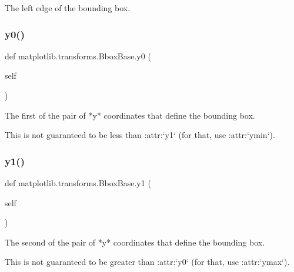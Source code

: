 \begin{DoxyVerb}The left edge of the bounding box.\end{DoxyVerb}
 \mbox{\label{classmatplotlib_1_1transforms_1_1BboxBase_a19dc90c8fe29252596fe6221eb2e272c}} 
\subsubsection{\texorpdfstring{y0()}{y0()}}
{\footnotesize\ttfamily def matplotlib.\+transforms.\+Bbox\+Base.\+y0 (\begin{DoxyParamCaption}\item[{}]{self }\end{DoxyParamCaption})}

\begin{DoxyVerb}The first of the pair of *y* coordinates that define the bounding box.

This is not guaranteed to be less than :attr:`y1` (for that, use
:attr:`ymin`).
\end{DoxyVerb}
 \mbox{\label{classmatplotlib_1_1transforms_1_1BboxBase_a8e78484c0c5b6d158b3d2b538ae3b2fc}} 
\subsubsection{\texorpdfstring{y1()}{y1()}}
{\footnotesize\ttfamily def matplotlib.\+transforms.\+Bbox\+Base.\+y1 (\begin{DoxyParamCaption}\item[{}]{self }\end{DoxyParamCaption})}

\begin{DoxyVerb}The second of the pair of *y* coordinates that define the bounding box.

This is not guaranteed to be greater than :attr:`y0` (for that, use
:attr:`ymax`).
\end{DoxyVerb}
 \mbox{\label{classmatplotlib_1_1transforms_1_1BboxBase_a3c2ca856d20e2186e624fbee576e0b42}} 
